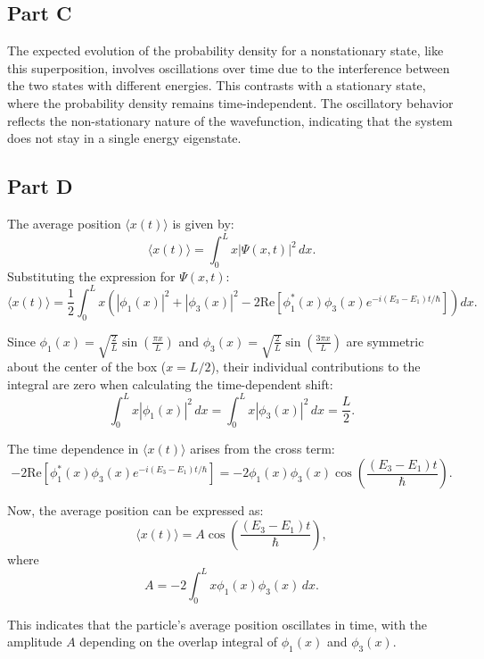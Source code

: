 \documentclass{article}
\begin{document}
\begin{adjustwidth}{5pt}{5pt}
\subsection*{Part C}
The expected evolution of the probability density for a nonstationary state, like this superposition, involves oscillations over time due to the interference between the two states with different energies. This contrasts with a stationary state, where the probability density remains time-independent. The oscillatory behavior reflects the non-stationary nature of the wavefunction, indicating that the system does not stay in a single energy eigenstate.

\subsection*{Part D}
The average position $\langle x(t) \rangle$ is given by:
\[
\langle x(t) \rangle = \int_0^L x |\Psi(x, t)|^2 \, dx.
\]
Substituting the expression for $\Psi(x, t)$:
\[
\langle x(t) \rangle = \frac{1}{2} \int_0^L x \left( |\phi_1(x)|^2 + |\phi_3(x)|^2 - 2 \text{Re}[\phi_1^*(x) \phi_3(x) e^{-i(E_3 - E_1) t/\hbar}] \right) dx.
\]

Since $\phi_1(x) = \sqrt{\frac{2}{L}} \sin\left(\frac{\pi x}{L}\right)$ and $\phi_3(x) = \sqrt{\frac{2}{L}} \sin\left(\frac{3\pi x}{L}\right)$ are symmetric about the center of the box ($x = L/2$), their individual contributions to the integral are zero when calculating the time-dependent shift:
\[
\int_0^L x |\phi_1(x)|^2 \, dx = \int_0^L x |\phi_3(x)|^2 \, dx = \frac{L}{2}.
\]

The time dependence in $\langle x(t) \rangle$ arises from the cross term:
\[
-2 \text{Re} \left[ \phi_1^*(x) \phi_3(x) e^{-i(E_3 - E_1)t/\hbar} \right] = -2 \phi_1(x) \phi_3(x) \cos\left( \frac{(E_3 - E_1) t}{\hbar} \right).
\]

Now, the average position can be expressed as:
\[
\langle x(t) \rangle = A \cos\left( \frac{(E_3 - E_1) t}{\hbar} \right),
\]
where
\[
A = -2 \int_0^L x \phi_1(x) \phi_3(x) \, dx.
\]

This indicates that the particle's average position oscillates in time, with the amplitude \(A\) depending on the overlap integral of $\phi_1(x)$ and $\phi_3(x)$.

\end{adjustwidth}
\end{document}
